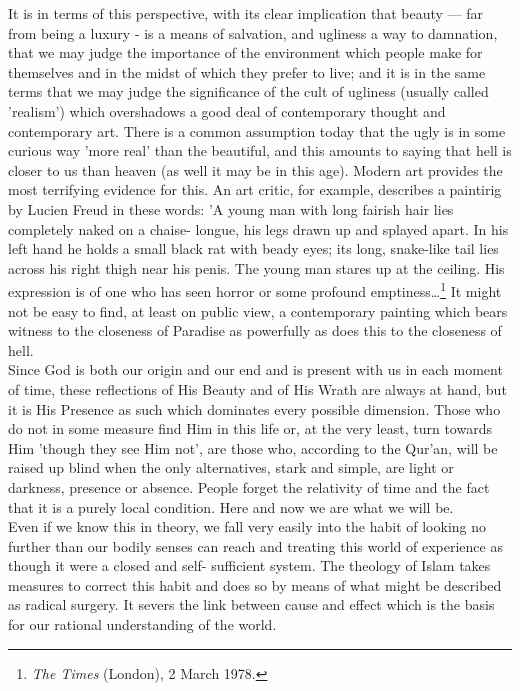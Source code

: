 \documentclass[11pt, b5paper, twoside]{book}
\begin{document}
It is in terms of this perspective, with its clear implication that beauty --- far from being a luxury 
- is a means of salvation, and ugliness a way to damnation, that we may judge the importance of the 
environment which people make for themselves and in the midst of which they prefer to live; and it is 
in the same terms that we may judge the significance of the cult of ugliness (usually called 
'realism') which overshadows a good deal of contemporary thought and contemporary art. There is a 
common assumption today that the ugly is in some curious way 'more real' than the beautiful, and this 
amounts to saying that hell is closer to us than heaven (as well it may be in this age). Modern art 
provides the most terrifying evidence for this. An art critic, for example, describes a paintirig by 
Lucien Freud in these words: 'A young man with long fairish hair lies completely naked on a chaise-
longue, his legs drawn up and splayed apart. In his left hand he holds a small black rat with beady 
eyes; its long, snake-like tail lies across his right thigh near his penis. The young man stares up 
at the ceiling. His expression is of one who has seen horror or some profound emptiness\ldots{}\footnote{\emph{The Times} (London), 2 March 1978.} It 
might not be easy to find, at least on public view, a contemporary painting which bears witness to 
the closeness of Paradise as powerfully as does this to the closeness of hell. \\

Since God is both our origin and our end and is present with us in each moment of time, these 
reflections of His Beauty and of His Wrath are always at hand, but it is His Presence as such which 
dominates every possible dimension. Those who do not in some measure find Him in this life or, at the 
very least, turn towards Him 'though they see Him not', are those who, according to the Qur'an, will 
be raised up blind when the only alternatives, stark and simple, are light or darkness, presence or 
absence. People forget the relativity of time and the fact that it is a purely local condition. Here 
and now we are what we will be. \\

Even if we know this in theory, we fall very easily into the habit of looking no further than our 
bodily senses can reach and treating this world of experience as though it were a closed and self-
sufficient system. The theology of Islam takes measures to correct this habit and does so by means of 
what might be described as radical surgery. It severs the link between cause and effect which is the 
basis for our rational understanding of the world. \\
\end{document}

